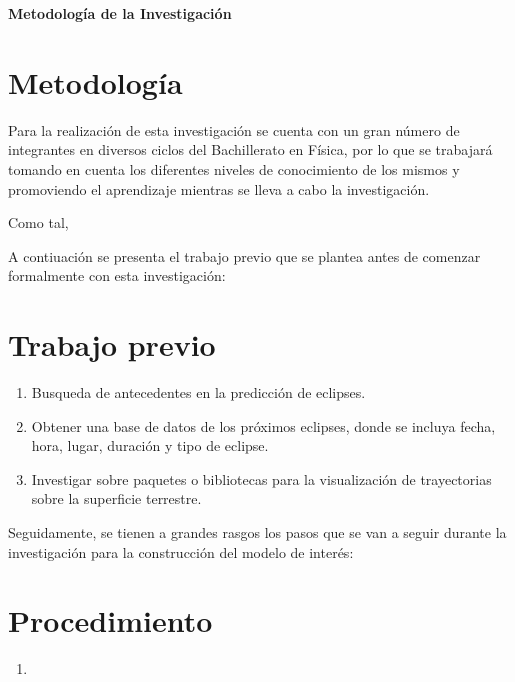 \setcounter{section}{0}
\begin{singlespace}

\huge{\textbf{Metodología de la Investigación}}
\normalsize

\section{Metodología}
\hspace{1 cm}  Para la realización de esta investigación se cuenta con un gran número de integrantes en diversos ciclos del Bachillerato en Física, por lo que se trabajará tomando en cuenta los diferentes niveles de conocimiento de los mismos y promoviendo el aprendizaje mientras se lleva a cabo la investigación.


\hspace{1 cm} Como tal,

\hspace{1 cm} 

\hspace{1 cm} 



\hspace{1 cm} A contiuación se presenta el trabajo previo que se plantea antes de comenzar formalmente con esta investigación:
\section{Trabajo previo}
\begin{enumerate}
    \item Busqueda de antecedentes en la predicción de eclipses.
    \item Obtener una base de datos de los próximos eclipses, donde se incluya fecha, hora, lugar, duración y tipo de eclipse.
    \item Investigar sobre paquetes o bibliotecas para la visualización de trayectorias sobre la superficie terrestre.
\end{enumerate}

\hspace{1 cm} Seguidamente, se tienen a grandes rasgos los pasos que se van a seguir durante la investigación para la construcción del modelo de interés:

\section{Procedimiento}
\begin{enumerate}
    \item
\end{enumerate}

\end{singlespace}